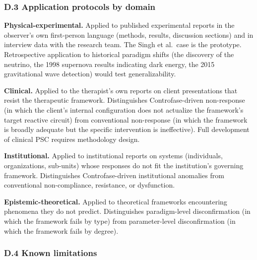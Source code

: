 \documentclass[
  11pt,
  a4paper,
]{article}
\begin{document}
\subsubsection{D.3 Application protocols by
domain}\label{d.3-application-protocols-by-domain}

\textbf{Physical-experimental.} Applied to published experimental
reports in the observer's own first-person language (methods, results,
discussion sections) and in interview data with the research team. The
Singh et al.~case is the prototype. Retrospective application to
historical paradigm shifts (the discovery of the neutrino, the 1998
supernova results indicating dark energy, the 2015 gravitational wave
detection) would test generalizability.

\textbf{Clinical.} Applied to the therapist's own reports on client
presentations that resist the therapeutic framework. Distinguishes
Controfase-driven non-response (in which the client's internal
configuration does not actualize the framework's target reactive
circuit) from conventional non-response (in which the framework is
broadly adequate but the specific intervention is ineffective). Full
development of clinical PSC requires methodology design.

\textbf{Institutional.} Applied to institutional reports on systems
(individuals, organizations, sub-units) whose responses do not fit the
institution's governing framework. Distinguishes Controfase-driven
institutional anomalies from conventional non-compliance, resistance, or
dysfunction.

\textbf{Epistemic-theoretical.} Applied to theoretical frameworks
encountering phenomena they do not predict. Distinguishes paradigm-level
disconfirmation (in which the framework fails by type) from
parameter-level disconfirmation (in which the framework fails by
degree).

\subsubsection{D.4 Known limitations}\label{d.4-known-limitations}
\end{document}
